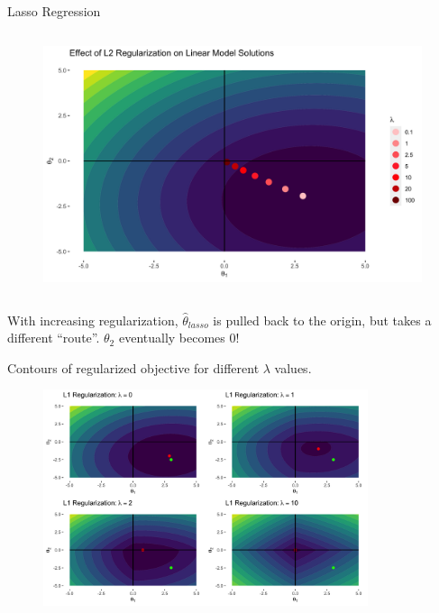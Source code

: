 \documentclass[11pt,compress,t,notes=noshow, xcolor=table]{beamer}
\begin{document}
\begin{vbframe}{Lasso Regression}
\begin{columns}
\begin{column}{0.5\textwidth}
\lz
\begin{figure}
\includegraphics[width=0.99\textwidth]{figure/lin_reg_l2.png}
\end{figure}
\end{column}
\end{columns}



\lz

With increasing regularization, $\hat{\theta}_{\textit{lasso}}$ is pulled back to the origin, but takes a different ``route''. $\theta_2$ eventually becomes 0!


\framebreak 

Contours of regularized objective for different $\lambda$ values.
\begin{figure}
\includegraphics[width=0.85\textwidth]{figure/lasso_contours.png}
\end{figure}


\end{vbframe}
\end{document}
